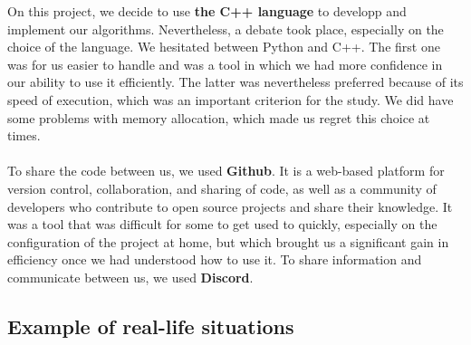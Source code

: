 On this project, we decide to use \textbf{the C++ language} to developp and implement our algorithms. Nevertheless, a debate took place, especially on the choice of the language. We hesitated between Python and C++. The first one was for us easier to handle and was a tool in which we had more confidence in our ability to use it efficiently. The latter was nevertheless preferred because of its speed of execution, which was an important criterion for the study. We did have some problems with memory allocation, which made us regret this choice at times.  \\ \\
To share the code between us, we used \textbf{Github}\footnotemark {}. It is a web-based platform for version control, collaboration, and sharing of code, as well as a community of developers who contribute to open source projects and share their knowledge. It was a tool that was difficult for some to get used to quickly, especially on the configuration of the project at home, but which brought us a significant gain in efficiency once we had understood how to use it. To share information and communicate between us, we used \textbf{Discord}.




\subsection{Example of real-life situations}

